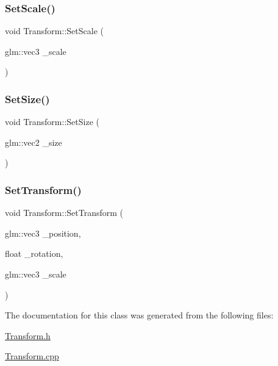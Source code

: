 \mbox{\label{class_transform_af741bc745e441e4c3175f9aff07c5d98}} 
\subsubsection{\texorpdfstring{Set\+Scale()}{SetScale()}}
{\footnotesize\ttfamily void Transform\+::\+Set\+Scale (\begin{DoxyParamCaption}\item[{glm\+::vec3}]{\+\_\+scale }\end{DoxyParamCaption})}

\mbox{\label{class_transform_a8fb9524f56de0f31984d526156eec5cb}} 
\subsubsection{\texorpdfstring{Set\+Size()}{SetSize()}}
{\footnotesize\ttfamily void Transform\+::\+Set\+Size (\begin{DoxyParamCaption}\item[{glm\+::vec2}]{\+\_\+size }\end{DoxyParamCaption})}

\mbox{\label{class_transform_af6c69e65b609a3d9e6028b4ffc7baada}} 
\subsubsection{\texorpdfstring{Set\+Transform()}{SetTransform()}}
{\footnotesize\ttfamily void Transform\+::\+Set\+Transform (\begin{DoxyParamCaption}\item[{glm\+::vec3}]{\+\_\+position,  }\item[{float}]{\+\_\+rotation,  }\item[{glm\+::vec3}]{\+\_\+scale }\end{DoxyParamCaption})}



The documentation for this class was generated from the following files\+:\begin{DoxyCompactItemize}
\item 
\mbox{\hyperlink{_transform_8h}{Transform.\+h}}\item 
\mbox{\hyperlink{_transform_8cpp}{Transform.\+cpp}}\end{DoxyCompactItemize}
